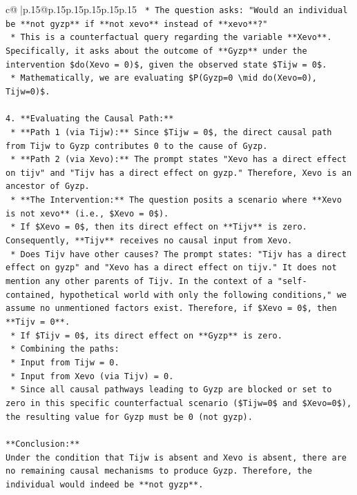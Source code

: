 \documentclass{article}
\begin{document}
{\begin{supertabular}{c@{$\;$}|p{.15\linewidth}@{}p{.15\linewidth}p{.15\linewidth}p{.15\linewidth}p{.15\linewidth}p{.15\linewidth}}
{{{\texttt{    *   The question asks: "Would an individual be **not gyzp** if **not xevo** instead of **xevo**?"} \\
\texttt{    *   This is a counterfactual query regarding the variable **Xevo**. Specifically, it asks about the outcome of **Gyzp** under the intervention \$do(Xevo = 0)\$, given the observed state \$Tijw = 0\$.} \\
\texttt{    *   Mathematically, we are evaluating \$P(Gyzp=0 \textbackslash{}mid do(Xevo=0), Tijw=0)\$.} \\
\\ 
\texttt{4.  **Evaluating the Causal Path:**} \\
\texttt{    *   **Path 1 (via Tijw):** Since \$Tijw = 0\$, the direct causal path from Tijw to Gyzp contributes 0 to the cause of Gyzp.} \\
\texttt{    *   **Path 2 (via Xevo):** The prompt states "Xevo has a direct effect on tijv" and "Tijv has a direct effect on gyzp." Therefore, Xevo is an ancestor of Gyzp.} \\
\texttt{    *   **The Intervention:** The question posits a scenario where **Xevo is not xevo** (i.e., \$Xevo = 0\$).} \\
\texttt{    *   If \$Xevo = 0\$, then its direct effect on **Tijv** is zero. Consequently, **Tijv** receives no causal input from Xevo.} \\
\texttt{    *   Does Tijv have other causes? The prompt states: "Tijv has a direct effect on gyzp" and "Xevo has a direct effect on tijv." It does not mention any other parents of Tijv. In the context of a "self{-}contained, hypothetical world with only the following conditions," we assume no unmentioned factors exist. Therefore, if \$Xevo = 0\$, then **Tijv = 0**.} \\
\texttt{    *   If \$Tijv = 0\$, its direct effect on **Gyzp** is zero.} \\
\texttt{    *   Combining the paths:} \\
\texttt{        *   Input from Tijw = 0.} \\
\texttt{        *   Input from Xevo (via Tijv) = 0.} \\
\texttt{    *   Since all causal pathways leading to Gyzp are blocked or set to zero in this specific counterfactual scenario (\$Tijw=0\$ and \$Xevo=0\$), the resulting value for Gyzp must be 0 (not gyzp).} \\
\\ 
\texttt{**Conclusion:**} \\
\texttt{Under the condition that Tijw is absent and Xevo is absent, there are no remaining causal mechanisms to produce Gyzp. Therefore, the individual would indeed be **not gyzp**.} \\
}}}
\end{supertabular}}
\end{document}
